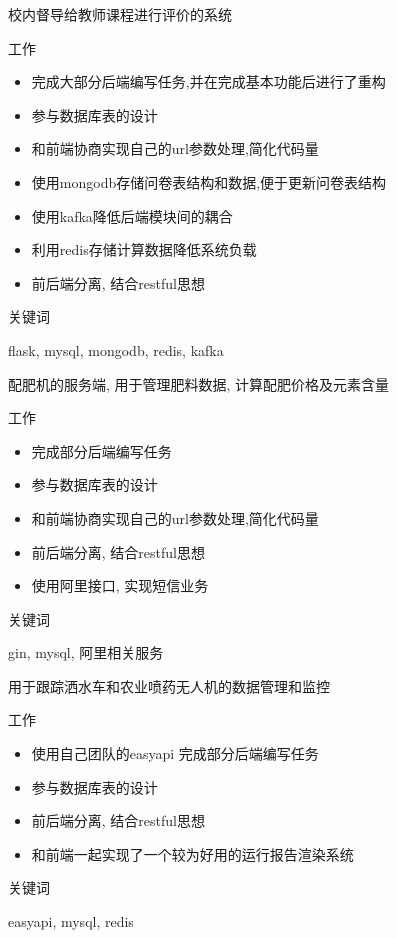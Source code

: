 \documentclass{resume}
\begin{document}
\begin{onehalfspacing}
校内督导给教师课程进行评价的系统

工作
\begin{itemize}
  \item 完成大部分后端编写任务,并在完成基本功能后进行了重构
  \item 参与数据库表的设计
  \item 和前端协商实现自己的url参数处理,简化代码量
  \item 使用mongodb存储问卷表结构和数据,便于更新问卷表结构
  \item 使用kafka降低后端模块间的耦合
  \item 利用redis存储计算数据降低系统负载
  \item 前后端分离, 结合restful思想
\end{itemize}
关键词

flask, mysql, mongodb, redis, kafka
\end{onehalfspacing}

\begin{onehalfspacing}
配肥机的服务端, 用于管理肥料数据, 计算配肥价格及元素含量

工作
\begin{itemize}
  \item 完成部分后端编写任务
  \item 参与数据库表的设计
  \item 和前端协商实现自己的url参数处理,简化代码量
  \item 前后端分离, 结合restful思想
  \item 使用阿里接口, 实现短信业务
\end{itemize}
关键词

gin, mysql, 阿里相关服务
\end{onehalfspacing}

\begin{onehalfspacing}
用于跟踪洒水车和农业喷药无人机的数据管理和监控

工作
\begin{itemize}
  \item 使用自己团队的easyapi 完成部分后端编写任务
  \item 参与数据库表的设计
  \item 前后端分离, 结合restful思想
  \item 和前端一起实现了一个较为好用的运行报告渲染系统
\end{itemize}
关键词

easyapi, mysql, redis
\end{onehalfspacing}
\end{document}
